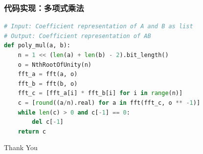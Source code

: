 \documentclass[UTF8]{ctexbeamer}
\begin{document}
\begin{frame}[fragile]
    \frametitle{代码实现：多项式乘法}
    \begin{lstlisting}[language=Python]
# Input: Coefficient representation of A and B as list
# Output: Coefficient representation of AB
def poly_mul(a, b):
    n = 1 << (len(a) + len(b) - 2).bit_length()
    o = NthRootOfUnity(n)
    fft_a = fft(a, o)
    fft_b = fft(b, o)
    fft_c = [fft_a[i] * fft_b[i] for i in range(n)]
    c = [round((a/n).real) for a in fft(fft_c, o ** -1)]
    while len(c) > 0 and c[-1] == 0:
        del c[-1]
    return c
    \end{lstlisting}
\end{frame}

\begin{frame}
    \begin{center}
        \Huge Thank You
    \end{center}
\end{frame}
\end{document}
